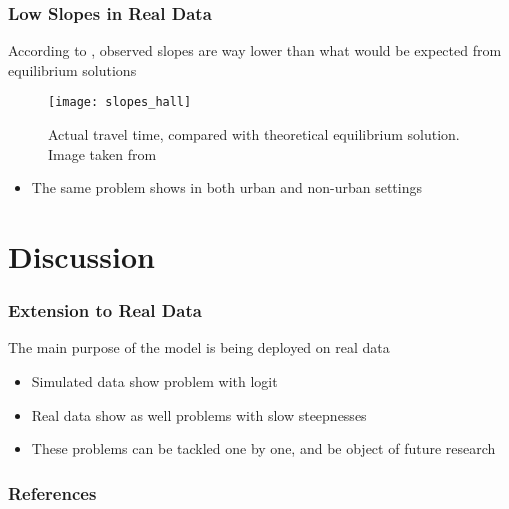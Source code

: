 \documentclass[hyperref={pdfpagelabels=false}]{beamer}
\begin{document}
\begin{frame}
  \frametitle{Low Slopes in Real Data}
  According to \textcite{https://doi.org/10.1111/iere.12692},
  observed slopes are way lower than what would be expected from equilibrium solutions
  \begin{figure}
    \centering
    \texttt{[image: slopes\_hall]}
    \caption{Actual travel time, compared with theoretical equilibrium solution. Image taken from \textcite{https://doi.org/10.1111/iere.12692}}
  \end{figure}
  \begin{itemize}
  \item The same problem shows in both urban and non-urban settings
  \end{itemize}
\end{frame}

\section{Discussion}

\begin{frame}
  \tableofcontents[currentsection]
\end{frame}

\begin{frame}
  \frametitle{Extension to Real Data}
  The main purpose of the model is being deployed on real data
  \begin{itemize}
  \item Simulated data show problem with logit
  \item Real data show as well problems with slow steepnesses
  \item These problems can be tackled one by one, and be object of future research
  \end{itemize}
\end{frame}

\begin{frame}[allowframebreaks]
  \frametitle{References}
  \printbibliography
\end{frame}
\end{document}

